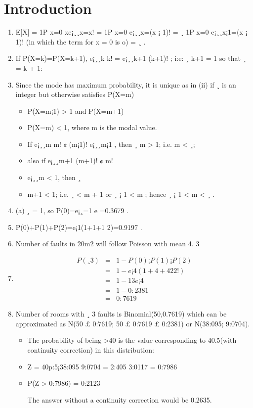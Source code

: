 \documentclass[a4paper,12pt]{article}
\begin{document}
\section{Introduction}

\begin{enumerate}
\item E[X] =
1P
x=0
xe¡¸¸x=x!
=
1P
x=0
e¡¸¸x=(x ¡ 1)!
= ¸
1P
x=0
e¡¸¸x¡1=(x ¡ 1)! (in which the term for x = 0 is o)
= ¸
.
\item If P(X=k)=P(X=k+1), e¡¸¸k
k! = e¡¸¸k+1
(k+1)! ; i:e: ¸
k+1 = 1 so that ¸ = k + 1:
\item Since the mode has maximum probability, it is unique as in (ii) if ¸ is an integer but otherwise
satisfies P(X=m)

\begin{itemize}
    \item P(X=m¡1) > 1 and P(X=m+1)
\item P(X=m) < 1, where m is the modal value.
\item If e¡¸¸m
m! ¢ (m¡1)!
e¡¸¸m¡1 , then ¸
m > 1; i.e. m < ¸;
\item also if e¡¸¸m+1
(m+1)! ¢ m!
\item e¡¸¸m < 1, then ¸
\item m+1 < 1; i.e. ¸ < m + 1 or ¸ ¡ 1 < m ;
hence ¸ ¡ 1 < m < ¸ .
\end{itemize}

\item (a) ¸ = 1, so P(0)=e¡¸=1
e =0.3679 .
\item P(0)+P(1)+P(2)=e¡1(1+1+1
2)=0.9197 .
\item Number of faults in 20m2 will follow Poisson with mean 4.
3
\item 

\begin{eqnarray*}
P(¸ 3) &=& 1 - P(0) ¡ P(1) ¡ P(2)\\
&=& 1 - e¡4(1 + 4 + 42 2! )\\
&=& 1 - 13e¡4\\
&=& 1 - 0:2381 \\
&=& 0:7619
\end{eqnarray*}
\item Number of rooms with ¸ 3 faults is Binomial(50,0.7619) which can be approximated as
N(50 £ 0:7619; 50 £ 0:7619 £ 0:2381) or N(38:095; 9:0704). 
\begin{itemize}
\item The probability of being >40 is the
value corresponding to 40.5(with continuity correction) in this distribution:
\item Z = 40p:5¡38:095
9:0704
= 2:405
3:0117 = 0:7986
\item P(Z > 0:7986) = 0:2123
\item [The answer without a continuity correction would be 0.2635.]
\end{itemize}
\end{enumerate}
\end{document}
